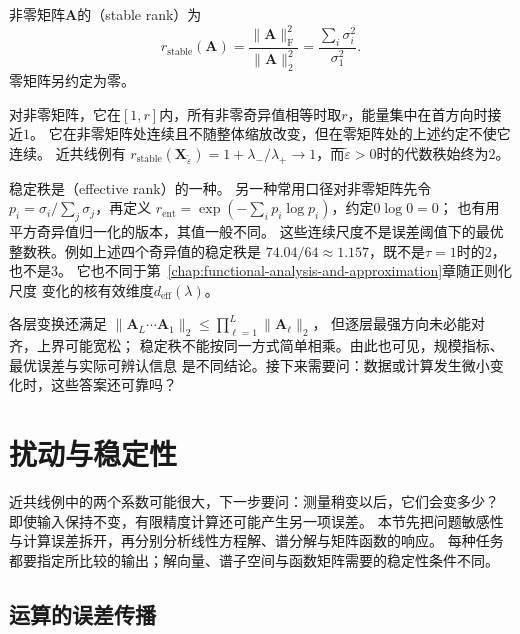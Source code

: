 \begin{definition}[稳定秩]
\label{def:matrix-analysis-stable-rank}
非零矩阵$\bm A$的（stable rank）为
\begin{equation}
 r_{\mathrm{stable}}(\bm A)
 =\frac{\lVert\bm A\rVert_{\mathrm F}^2}{\lVert\bm A\rVert_2^2}
 =\frac{\sum_i\sigma_i^2}{\sigma_1^2}.
 \label{eq:matrix-analysis-stable-rank}
\end{equation}
零矩阵另约定为零。
\end{definition}
对非零矩阵，它在$[1,r]$内，所有非零奇异值相等时取$r$，能量集中在首方向时接近$1$。
它在非零矩阵处连续且不随整体缩放改变，但在零矩阵处的上述约定不使它连续。
近共线例有
$r_{\mathrm{stable}}(\bm X_{\widetilde\varepsilon})
=1+\lambda_-/\lambda_+\to1$，而$\widetilde\varepsilon>0$时的代数秩始终为$2$。

稳定秩是（effective rank）的一种。
另一种常用口径对非零矩阵先令$p_i=\sigma_i/\sum_j\sigma_j$，再定义
$r_{\mathrm{ent}}=\exp(-\sum_i p_i\log p_i)$，约定$0\log0=0$；
也有用平方奇异值归一化的版本，其值一般不同。
这些连续尺度不是误差阈值下的最优整数秩。例如上述四个奇异值的稳定秩是
$74.04/64\approx1.157$，既不是$\tau=1$时的$2$，也不是$3$。
它也不同于第~\ref{chap:functional-analysis-and-approximation}章随正则化尺度
变化的核有效维度$d_{\mathrm{eff}}(\lambda)$。

各层变换还满足
$\lVert\bm A_L\cdots\bm A_1\rVert_2\leq\prod_{\ell=1}^L\lVert\bm A_\ell\rVert_2$，
但逐层最强方向未必能对齐，上界可能宽松；
稳定秩不能按同一方式简单相乘。由此也可见，规模指标、最优误差与实际可辨认信息
是不同结论。接下来需要问：数据或计算发生微小变化时，这些答案还可靠吗？

\section{扰动与稳定性}
\label{sec:linear-algebra-stability}
\label{sec:matrix-analysis-conditioning-perturbation}


近共线例中的两个系数可能很大，下一步要问：测量稍变以后，它们会变多少？
即使输入保持不变，有限精度计算还可能产生另一项误差。
本节先把问题敏感性与计算误差拆开，再分别分析线性方程解、谱分解与矩阵函数的响应。
每种任务都要指定所比较的输出；解向量、谱子空间与函数矩阵需要的稳定性条件不同。

\subsection{运算的误差传播}
\label{sec:linear-algebra-error-propagation}
\label{sec:ch06-error-propagation}


